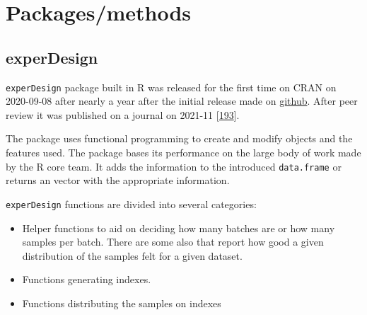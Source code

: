 \documentclass[
  12pt,
  a4paper,
  twoside,
  openright]{book}
\begin{document}
\hypertarget{packagesmethods}{%
\section{Packages/methods}\label{packagesmethods}}

\hypertarget{experdesign-1}{%
\subsection{experDesign}\label{experdesign-1}}

\texttt{experDesign} package built in R was released for the first time on CRAN on 2020-09-08 after nearly a year after the initial release made on \href{https://github.com/llrs/experDesign}{github}.
After peer review it was published on a journal on 2021-11 {[}\protect\hyperlink{ref-revillasancho2021}{193}{]}.

The package uses functional programming to create and modify objects and the features used.
The package bases its performance on the large body of work made by the R core team.
It adds the information to the introduced \texttt{data.frame} or returns an vector with the appropriate information.

\texttt{experDesign} functions are divided into several categories:

\begin{itemize}
\item
  Helper functions to aid on deciding how many batches are or how many samples per batch.
  There are some also that report how good a given distribution of the samples felt for a given dataset.
\item
  Functions generating indexes.
\item
  Functions distributing the samples on indexes
\end{itemize}
\end{document}
